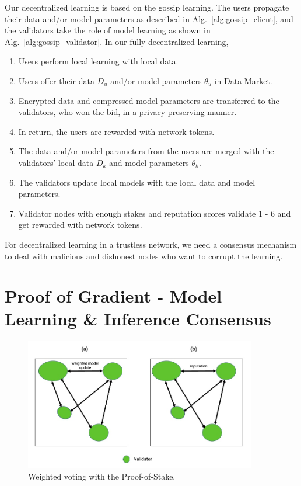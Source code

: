 \documentclass[11pt,letterpaper]{article}
\begin{document}
Our decentralized learning is based on the gossip learning. The users propagate their data and/or model parameters as described in Alg.~\ref{alg:gossip_client}, and the validators take the role of model learning as shown in Alg.~\ref{alg:gossip_validator}. In our fully decentralized learning,
\begin{enumerate}
  \item Users perform local learning with local data.
  \item Users offer their data $D_u$ and/or model parameters $\theta_u$ in Data Market.
  \item Encrypted data and compressed model parameters are transferred to the validators, who won the bid, in a privacy-preserving manner.
  \item In return, the users are rewarded with network tokens.
  \item The data and/or model parameters from the users are merged with the validators' local data $D_k$ and model parameters $\theta_k$.
  \item The validators update local models with the local data and model parameters.
  \item Validator nodes with enough stakes and reputation scores validate 1 - 6 and get rewarded with network tokens.
\end{enumerate}
For decentralized learning in a trustless network, we need a consensus mechanism to deal with malicious and dishonest nodes who want to corrupt the learning.

\section{Proof of Gradient - Model Learning \& Inference Consensus}

\begin{figure}[t]
\centering
	\includegraphics[width=0.9\textwidth]{fig/consensus.jpg}
\caption{Weighted voting with the Proof-of-Stake.} 
\label{fig:voting}
\end{figure}
\end{document}
